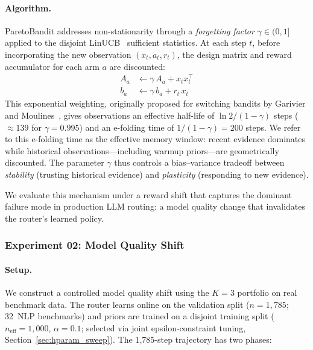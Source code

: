 \paragraph{Algorithm.}
ParetoBandit addresses non-stationarity through a \emph{forgetting
factor} $\gamma \in (0, 1]$ applied to the disjoint
LinUCB~\cite{li2010contextual} sufficient statistics.
At each step $t$, before incorporating the new observation
$(x_t, a_t, r_t)$, the design matrix and reward accumulator for
each arm $a$ are discounted:
\begin{align}
    A_a &\leftarrow \gamma \, A_a + x_t x_t^\top
    \label{eq:forget_A} \\
    b_a &\leftarrow \gamma \, b_a + r_t \, x_t
    \label{eq:forget_b}
\end{align}
This exponential weighting, originally proposed for
switching bandits by Garivier and
Moulines~\cite{garivier2011switching}, gives observations an
effective half-life of $\ln 2 / (1 - \gamma)$ steps
(${\approx}139$ for $\gamma{=}0.995$) and an e-folding time
of $1/(1-\gamma){=}200$ steps.
We refer to this e-folding time as the effective memory window:
recent evidence dominates while historical
observations---including warmup priors---are geometrically
discounted.
The parameter $\gamma$ thus controls a
bias--variance tradeoff between \emph{stability} (trusting
historical evidence) and \emph{plasticity} (responding to new
evidence).

We evaluate this mechanism under a reward shift that captures
the dominant failure mode in production LLM routing: a model
quality change that invalidates the router's learned policy.


\subsubsection{Experiment 02: Model Quality Shift}
\label{sec:reward_shift}

\paragraph{Setup.}
We construct a controlled model quality shift using the $K{=}3$
portfolio on real benchmark data.
The router learns online on the validation split
($n{=}1{,}785$; 32~NLP benchmarks) and priors are trained on a
disjoint training split ($n_{\mathrm{eff}}{=}1{,}000$, $\alpha{=}0.1$;
selected via joint epsilon-constraint tuning,
Section~\ref{sec:hparam_sweep}).
The 1{,}785-step trajectory has two phases:

